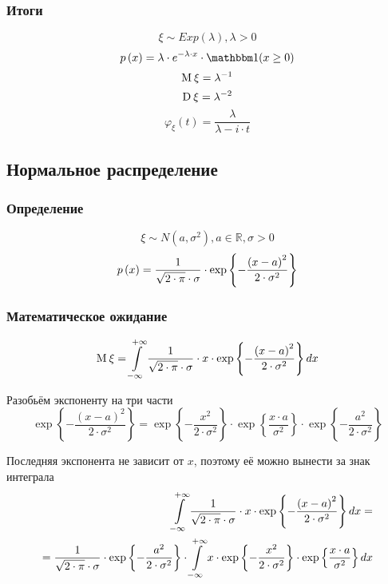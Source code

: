 \subsubsection{Итоги}
$$\xi \sim Exp\left( \lambda \right), \lambda>0$$
$$\pdf{x} = \lambda \cdot e^{-\lambda \cdot x} \cdot \indicator{x \ge 0}$$
$$\mean{\xi} = \lambda^{-1}$$
$$\dispersion{\xi} = \lambda^{-2}$$
$$\varphi_{\xi}\left( t \right)
    = \frac{\lambda}{\lambda - i \cdot t}$$

\subsection{Нормальное распределение}
\subsubsection{Определение}
$$\xi \sim N\left( a, \sigma^2 \right), a \in \mathbb{R}, \sigma > 0$$
$$\pdf{x}
    = \frac{1}{\sqrt{2 \cdot \pi} \cdot \sigma}
        \cdot \exp{\left\{ -\frac{\left( x-a \right)^2}
            {2 \cdot \sigma^2} \right\}}$$
\subsubsection{Математическое ожидание}
$$\mean{\xi}
    = \integral{-\infty}{+\infty}{x}{
        \frac{1}{\sqrt{2 \cdot \pi} \cdot \sigma}
            \cdot x \cdot \exp{\left\{
                -\frac{\left( x-a \right)^2}{2 \cdot \sigma^2} \right\}}}$$

Разобьём экспоненту на три части
$$\exp{\left\{-\frac{\left( x-a \right)^2}{2 \cdot \sigma^2} \right\}}
    = \exp{\left\{ - \frac{x^2}{2 \cdot \sigma^2} \right\}}
        \cdot \exp{\left\{ \frac{x \cdot a}{\sigma^2} \right\}}
        \cdot \exp{\left\{ - \frac{a^2}{2 \cdot \sigma^2} \right\}}$$

Последняя экспонента не зависит от $x$,
поэтому её можно вынести за знак интеграла
\begin{align*}
    \integral{-\infty}{+\infty}{x}{
        \frac{1}{\sqrt{2 \cdot \pi} \cdot \sigma}
            \cdot x \cdot \exp{\left\{
                -\frac{\left( x-a \right)^2}{2 \cdot \sigma^2} \right\}}} = \\
        = \frac{1}{\sqrt{2 \cdot \pi} \cdot \sigma}
                \cdot \exp{\left\{ - \frac{a^2}{2 \cdot \sigma^2} \right\}}
            \cdot \integral{-\infty}{+\infty}{x}{
                x \cdot \exp{\left\{ - \frac{x^2}{2 \cdot \sigma^2} \right\}}
                \cdot \exp{\left\{ \frac{x \cdot a}{\sigma^2} \right\}}}
\end{align*}

